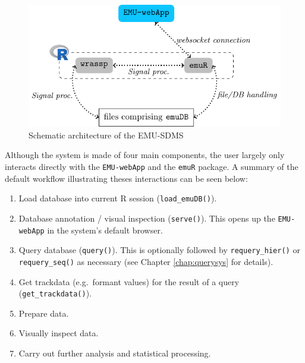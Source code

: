 \documentclass[]{book}
\providecommand{\tightlist}{%
  \setlength{\itemsep}{0pt}\setlength{\parskip}{0pt}}
\theoremstyle{definition}
\theoremstyle{definition}
\theoremstyle{definition}
\theoremstyle{remark}
\begin{document}
\begin{figure}

{\centering \includegraphics[width=0.75\linewidth]{pics/overview} 

}

\caption{Schematic architecture of the EMU-SDMS}\label{fig:overview-archOver}
\end{figure}

Although the system is made of four main components, the user largely
only interacts directly with the \texttt{EMU-webApp} and the
\texttt{emuR} package. A summary of the default workflow illustrating
theses interactions can be seen below:

\begin{enumerate}
\def\labelenumi{\arabic{enumi}.}
\tightlist
\item
  Load database into current R session (\texttt{load\_emuDB()}).
\item
  Database annotation / visual inspection (\texttt{serve()}). This opens
  up the \texttt{EMU-webApp} in the system's default browser.
\item
  Query database (\texttt{query()}). This is optionally followed by
  \texttt{requery\_hier()} or \texttt{requery\_seq()} as necessary (see
  Chapter \ref{chap:querysys} for details).
\item
  Get trackdata (e.g.~formant values) for the result of a query
  (\texttt{get\_trackdata()}).
\item
  Prepare data.
\item
  Visually inspect data.
\item
  Carry out further analysis and statistical processing.
\end{enumerate}
\end{document}
